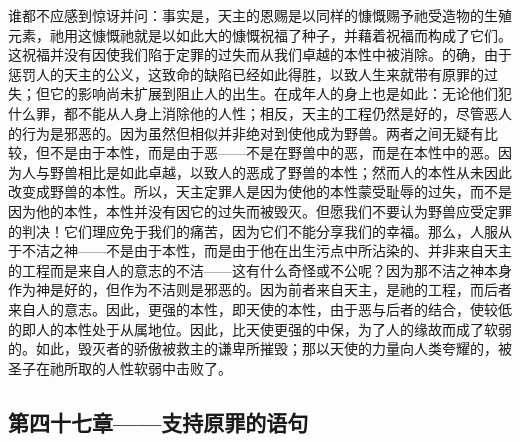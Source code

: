 谁都不应感到惊讶并问：事实是，天主的恩赐是以同样的慷慨赐予祂受造物的生殖元素，祂用这慷慨祂就是以如此大的慷慨祝福了种子，并藉着祝福而构成了它们。这祝福并没有因使我们陷于定罪的过失而从我们卓越的本性中被消除。的确，由于惩罚人的天主的公义，这致命的缺陷已经如此得胜，以致人生来就带有原罪的过失；但它的影响尚未扩展到阻止人的出生。在成年人的身上也是如此：无论他们犯什么罪，都不能从人身上消除他的人性；相反，天主的工程仍然是好的，尽管恶人的行为是邪恶的。因为虽然但相似并非绝对到使他成为野兽。两者之间无疑有比较，但不是由于本性，而是由于恶——不是在野兽中的恶，而是在本性中的恶。因为人与野兽相比是如此卓越，以致人的恶成了野兽的本性；然而人的本性从未因此改变成野兽的本性。所以，天主定罪人是因为使他的本性蒙受耻辱的过失，而不是因为他的本性，本性并没有因它的过失而被毁灭。但愿我们不要认为野兽应受定罪的判决！它们理应免于我们的痛苦，因为它们不能分享我们的幸福。那么，人服从于不洁之神——不是由于本性，而是由于他在出生污点中所沾染的、并非来自天主的工程而是来自人的意志的不洁——这有什么奇怪或不公呢？因为那不洁之神本身作为神是好的，但作为不洁则是邪恶的。因为前者来自天主，是祂的工程，而后者来自人的意志。因此，更强的本性，即天使的本性，由于恶与后者的结合，使较低的即人的本性处于从属地位。因此，比天使更强的中保，为了人的缘故而成了软弱的。如此，毁灭者的骄傲被救主的谦卑所摧毁；那以天使的力量向人类夸耀的，被圣子在祂所取的人性软弱中击败了。\par


\subsection{第四十七章——支持原罪的语句}


